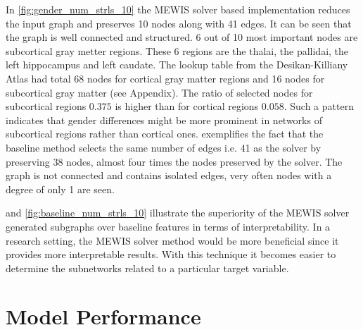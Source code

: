 \documentclass[msthesis.tex]{subfiles}
\begin{document}
In \cref{fig:gender_num_strls_10} the MEWIS solver based implementation reduces the input graph and preserves 10 nodes along with 41 edges. It can be seen that the graph is well connected and structured. 6 out of 10 most important nodes are subcortical gray metter regions. These 6 regions are the thalai, the pallidai, the left hippocampus and left caudate. The lookup table from the Desikan-Killiany Atlas had total 68 nodes for cortical gray matter regions and 16 nodes for subcortical gray matter (see Appendix). The ratio of selected nodes for subcortical regions $0.375$ is higher than for cortical regions $0.058$. Such a pattern indicates that gender differences might be more prominent in networks of subcortical regions rather than cortical ones.  exemplifies the fact that the baseline method selects the same number of edges i.e. 41 as the solver by preserving 38 nodes, almost four times the nodes preserved by the solver. The graph is not connected and contains isolated edges, very often nodes with a degree of only 1 are seen.

 and \cref{fig:baseline_num_strls_10} illustrate the superiority of the MEWIS solver generated subgraphs over baseline features in terms of interpretability. In a research setting, the MEWIS solver method would be more beneficial since it provides more interpretable results. With this technique it becomes easier to determine the subnetworks related to a particular target variable. 


\section{Model Performance}
\end{document}
